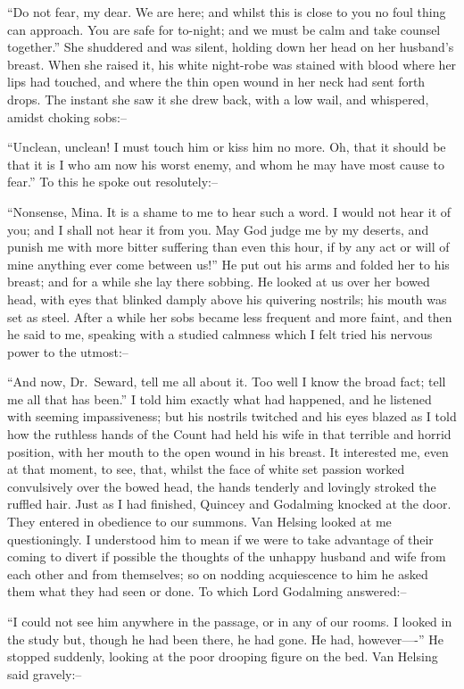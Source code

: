 \documentclass[12pt,openright]{book}
\begin{document}
“Do not fear, my dear. We are here; and whilst this is close to you no foul thing can approach. You are safe for to-night; and we must be calm and take counsel together.” She shuddered and was silent, holding down her head on her husband’s breast. When she raised it, his white night-robe was stained with blood where her lips had touched, and where the thin open wound in her neck had sent forth drops. The instant she saw it she drew back, with a low wail, and whispered, amidst choking sobs:–

“Unclean, unclean! I must touch him or kiss him no more. Oh, that it should be that it is I who am now his worst enemy, and whom he may have most cause to fear.” To this he spoke out resolutely:–

“Nonsense, Mina. It is a shame to me to hear such a word. I would not hear it of you; and I shall not hear it from you. May God judge me by my deserts, and punish me with more bitter suffering than even this hour, if by any act or will of mine anything ever come between us!” He put out his arms and folded her to his breast; and for a while she lay there sobbing. He looked at us over her bowed head, with eyes that blinked damply above his quivering nostrils; his mouth was set as steel. After a while her sobs became less frequent and more faint, and then he said to me, speaking with a studied calmness which I felt tried his nervous power to the utmost:–

“And now, Dr. Seward, tell me all about it. Too well I know the broad fact; tell me all that has been.” I told him exactly what had happened, and he listened with seeming impassiveness; but his nostrils twitched and his eyes blazed as I told how the ruthless hands of the Count had held his wife in that terrible and horrid position, with her mouth to the open wound in his breast. It interested me, even at that moment, to see, that, whilst the face of white set passion worked convulsively over the bowed head, the hands tenderly and lovingly stroked the ruffled hair. Just as I had finished, Quincey and Godalming knocked at the door. They entered in obedience to our summons. Van Helsing looked at me questioningly. I understood him to mean if we were to take advantage of their coming to divert if possible the thoughts of the unhappy husband and wife from each other and from themselves; so on nodding acquiescence to him he asked them what they had seen or done. To which Lord Godalming answered:–

“I could not see him anywhere in the passage, or in any of our rooms. I looked in the study but, though he had been there, he had gone. He had, however—-” He stopped suddenly, looking at the poor drooping figure on the bed. Van Helsing said gravely:–
\end{document}
